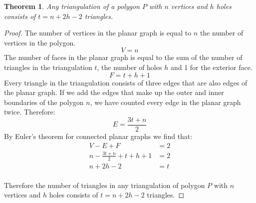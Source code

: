 \documentclass{article}
\newtheorem{theorem} {Theorem}
\begin{document}
\begin{enumerate}
    \begin{theorem}
      Any triangulation of a polygon $P$ with $n$ vertices and $h$ holes consists of $t = n+2h-2$ triangles.
    \end{theorem}
    \begin{proof}
      The number of vertices in the planar graph is equal to $n$ the number of vertices in the polygon. 
      \begin{equation*}
        V = n
      \end{equation*}
      The number of faces in the planar graph is equal to the sum of the number of triangles in the triangulation $t$, the number of holes $h$ and 1 for the exterior face.
      \begin{equation*}
        F = t + h + 1
      \end{equation*}
      Every triangle in the triangulation consists of three edges that are also edges of the planar graph. 
      If we add the edges that make up the outer and inner boundaries of the polygon $n$, we have counted every edge in the planar graph twice. Therefore:
      \begin{equation*}
        E = \frac{3t+n}{2}
      \end{equation*}
      By Euler's theorem for connected planar graphs we find that:
      \begin{align*}
        V - E + F &= 2 \\
        n - \frac{3t+n}{2} + t + h + 1 &= 2 \\
        n + 2h - 2 & = t \\
      \end{align*}

      Therefore the number of triangles in any triangulation of polygon $P$ with $n$ vertices and $h$ holes consists of $t=n+2h-2$ triangles.
    \end{proof}
  \end{enumerate}
\end{document}
